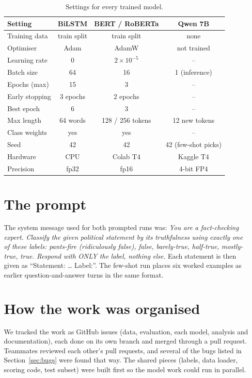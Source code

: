 \documentclass{nle}
\begin{document}
\begin{table}
\caption{Settings for every trained model.}
\begin{minipage}{\textwidth}
\begin{tabular}{lccc}
\hline\hline
Setting & BiLSTM & BERT / RoBERTa & Qwen 7B \\
\hline
Training data & train split & train split & none \\
Optimiser & Adam & AdamW & not trained \\
Learning rate & 0\hpt 001 & $2\times 10^{-5}$ & -- \\
Batch size & 64 & 16 & 1 (inference) \\
Epochs (max) & 15 & 3 & -- \\
Early stopping & 3 epochs & 2 epochs & -- \\
Best epoch & 6 & 3 & -- \\
Max length & 64 words & 128 / 256 tokens & 12 new tokens \\
Class weights & yes & yes & -- \\
Seed & 42 & 42 & 42 (few-shot picks) \\
Hardware & CPU & Colab T4 & Kaggle T4 \\
Precision & fp32 & fp16 & 4-bit FP4 \\
\hline\hline
\end{tabular}
\vspace{-1.5\baselineskip}
\end{minipage}
\end{table}

\section{The prompt}\label{app:prompt}
The system message used for both prompted runs was: \emph{You are a fact-checking expert. Classify the given political
statement by its truthfulness using exactly one of these labels: pants-fire (ridiculously false), false, barely-true,
half-true, mostly-true, true. Respond with ONLY the label, nothing else.} Each statement is then given as
``Statement: \ldots{} Label:''. The few-shot run places six worked examples as earlier question-and-answer turns in the
same format.

\section{How the work was organised}
We tracked the work as GitHub issues (data, evaluation, each model, analysis and documentation), each done on its own
branch and merged through a pull request. Teammates reviewed each other's pull requests, and several of the bugs
listed in Section~\ref{sec:bugs} were found that way. The shared pieces (labels, data loader, scoring code, test subset) were built
first so the model work could run in parallel.
\end{document}
